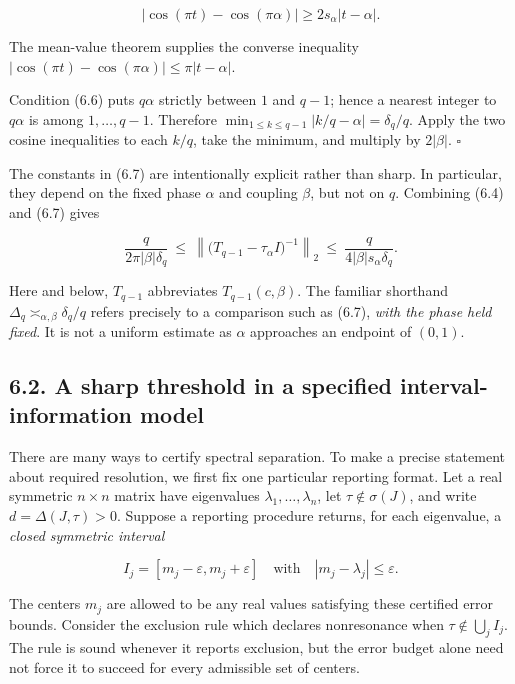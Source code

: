 \documentclass[
  11pt,
]{article}
\begin{document}
\[
|\cos(\pi t)-\cos(\pi\alpha)|\ge2s_\alpha|t-\alpha|.
\tag{6.8}
\]

The mean-value theorem supplies the converse inequality
\(|\cos(\pi t)-\cos(\pi\alpha)|\le\pi|t-\alpha|\).

Condition (6.6) puts \(q\alpha\) strictly between \(1\) and \(q-1\);
hence a nearest integer to \(q\alpha\) is among \(1,\ldots,q-1\).
Therefore \(\min_{1\le k\le q-1}|k/q-\alpha|=\delta_q/q\). Apply the two
cosine inequalities to each \(k/q\), take the minimum, and multiply by
\(2|\beta|\). \(\square\)

The constants in (6.7) are intentionally explicit rather than sharp. In
particular, they depend on the fixed phase \(\alpha\) and coupling
\(\beta\), but not on \(q\). Combining (6.4) and (6.7) gives

\[
\boxed{
\frac{q}{2\pi|\beta|\delta_q}
\ \le\
\left\|\bigl(T_{q-1}-\tau_\alpha I\bigr)^{-1}\right\|_2
\ \le\
\frac{q}{4|\beta|s_\alpha\delta_q}.}
\tag{6.9}
\]

Here and below, \(T_{q-1}\) abbreviates \(T_{q-1}(c,\beta)\). The
familiar shorthand \(\Delta_q\asymp_{\alpha,\beta}\delta_q/q\) refers
precisely to a comparison such as (6.7), \emph{with the phase held
fixed}. It is not a uniform estimate as \(\alpha\) approaches an
endpoint of \((0,1)\).

\subsection{6.2. A sharp threshold in a specified interval-information
model}\label{a-sharp-threshold-in-a-specified-interval-information-model}

There are many ways to certify spectral separation. To make a precise
statement about required resolution, we first fix one particular
reporting format. Let a real symmetric \(n\times n\) matrix have
eigenvalues \(\lambda_1,\ldots,\lambda_n\), let \(\tau\notin\sigma(J)\),
and write \(d=\Delta(J,\tau)>0\). Suppose a reporting procedure returns,
for each eigenvalue, a \emph{closed symmetric interval}

\[
I_j=[m_j-\varepsilon,m_j+\varepsilon]
\quad\text{with}\quad
|m_j-\lambda_j|\le\varepsilon.
\tag{6.10}
\]

The centers \(m_j\) are allowed to be any real values satisfying these
certified error bounds. Consider the exclusion rule which declares
nonresonance when \(\tau\notin\bigcup_j I_j\). The rule is sound
whenever it reports exclusion, but the error budget alone need not force
it to succeed for every admissible set of centers.
\end{document}
